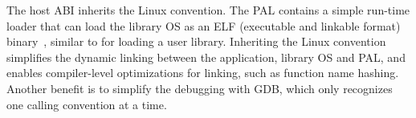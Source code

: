 The host ABI inherits the \graphenearch{} Linux convention. %
The PAL contains a simple run-time loader that can load the library OS as an ELF (executable and linkable format) binary~\cite{elf-format}, similar to  for loading a user library.
Inheriting the \graphenesgx{} Linux convention
simplifies the dynamic linking between the application, library OS and PAL,
and enables compiler-level optimizations for linking,
such as function name hashing.
Another benefit is to simplify the debugging with GDB, which only recognizes one calling convention at a time.









